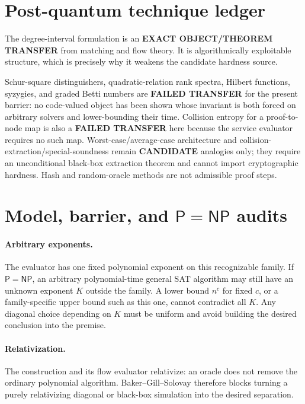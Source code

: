 \documentclass[11pt]{article}
\newcommand{\Status}[1]{\textbf{#1}}
\begin{document}
\section{Post-quantum technique ledger}

The degree-interval formulation is an \Status{EXACT OBJECT/THEOREM TRANSFER}
from matching and flow theory. It is algorithmically exploitable structure,
which is precisely why it weakens the candidate hardness source.

Schur-square distinguishers, quadratic-relation rank spectra, Hilbert
functions, syzygies, and graded Betti numbers are \Status{FAILED TRANSFER} for
the present barrier: no code-valued object has been shown whose invariant is
both forced on arbitrary solvers and lower-bounding their time. Collision
entropy for a proof-to-node map is also a \Status{FAILED TRANSFER} here because
the service evaluator requires no such map. Worst-case/average-case
architecture and collision-extraction/special-soundness remain
\Status{CANDIDATE} analogies only; they require an unconditional black-box
extraction theorem and cannot import cryptographic hardness. Hash and
random-oracle methods are not admissible proof steps.

\section{Model, barrier, and \(\mathsf{P}=\mathsf{NP}\) audits}

\paragraph{Arbitrary exponents.}
The evaluator has one fixed polynomial exponent on this recognizable family.
If \(\mathsf{P}=\mathsf{NP}\), an arbitrary polynomial-time general SAT
algorithm may still have an unknown exponent \(K\) outside the family. A lower
bound \(n^c\) for fixed \(c\), or a family-specific upper bound such as this
one, cannot contradict all \(K\). Any diagonal choice depending on \(K\)
must be uniform and avoid building the desired conclusion into the premise.

\paragraph{Relativization.}
The construction and its flow evaluator relativize: an oracle does not remove
the ordinary polynomial algorithm. Baker--Gill--Solovay therefore blocks
turning a purely relativizing diagonal or black-box simulation into the
desired separation.
\end{document}
